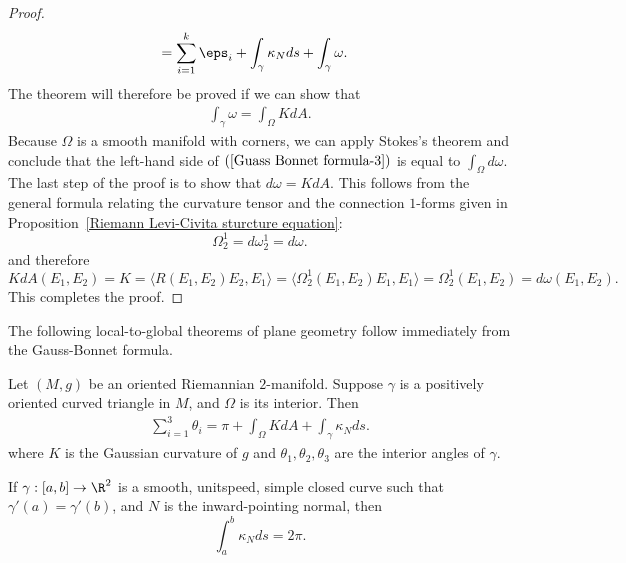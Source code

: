 \begin{proof}
\begin{align*}
&=\sum_{i=1}^{k}\eps_i+\int_{\gamma}\kappa_Nds+\int_{\gamma}\omega.
\end{align*}
The theorem will therefore be proved if we can show that
\begin{align}\label{Guass Bonnet formula-3}
\int_{\gamma}\omega=\int_{\Omega}KdA.
\end{align}
Because $\Omega$ is a smooth manifold with corners, we can apply Stokes's theorem and conclude that the left-hand side of $(\ref{Guass Bonnet formula-3})$ is equal to 
$\int_{\Omega}d\omega$. The last step of the proof is to show that $d\omega=KdA$. This follows from the general formula relating the curvature tensor and the connection 
$1$-forms given in Proposition~\ref{Riemann Levi-Civita sturcture equation}:
\[\Omega_2^1=d\omega_2^1=d\omega.\]
and therefore
\[KdA(E_1,E_2)=K=\langle R(E_1,E_2)E_2,E_1\rangle=\langle\Omega_2^1(E_1,E_2)E_1,E_1\rangle=\Omega_2^1(E_1,E_2)=d\omega(E_1,E_2).\]
This completes the proof.
\end{proof}
The following local-to-global theorems of plane geometry follow immediately from the Gauss-Bonnet formula.
\begin{corollary}\label{Riemann triangle interior sum}
Let $(M,g)$ be an oriented Riemannian $2$-manifold. Suppose $\gamma$ is a positively oriented curved triangle in $M$, and $\Omega$ is its interior. Then
\begin{align}\label{Riemann triangle interior sum-1}
\sum_{i=1}^{3}\theta_i=\pi+\int_{\Omega}KdA+\int_{\gamma}\kappa_Nds.
\end{align}
where $K$ is the Gaussian curvature of $g$ and $\theta_1,\theta_2,\theta_3$ are the interior angles of $\gamma$.
\end{corollary}
\begin{corollary}
If $\gamma:[a,b]\to\R^2$ is a smooth, unitspeed, simple closed curve such that $\gamma'(a)=\gamma'(b)$, and $N$ is the inward-pointing normal, then
\[\int_a^b\kappa_Nds=2\pi.\]
\end{corollary}
